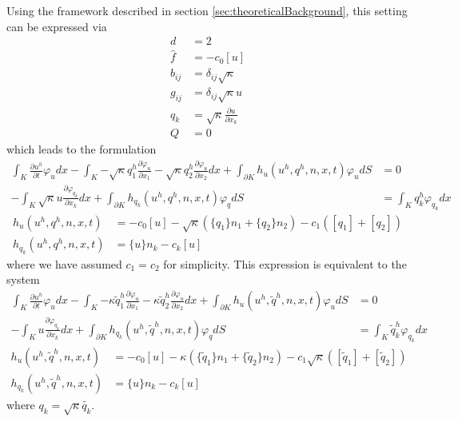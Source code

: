 Using the framework described in section \ref{sec:theoreticalBackground}, this
setting can be expressed via
\begin{align}
  d &= 2\\
  \hat{f} &= -c_0 [u]\\
  b_{ij} &= \delta_{ij} \sqrt{\kappa}\\
  g_{ij} &= \delta_{ij} \sqrt{\kappa} u\\
  q_k &= \sqrt{\kappa} \frac{\partial u}{\partial x_k}\\
  Q &= 0
\end{align}
which leads to the formulation
\begin{align}
\label{eq:heat_u_equation}
	\int_K {\frac{\partial u^h}{\partial t} \varphi_u dx}
	- \int_K {
		-\sqrt{\kappa} q_1^h \frac{\partial \varphi_u}{\partial x_1}
		-\sqrt{\kappa} q_2^h \frac{\partial \varphi_u}{\partial x_2}
	dx}
	+ \int_{\partial K} {h_u(u^h, q^h, n, x, t) \varphi_u dS}
	&= 0\\
\label{eq:heat_q_equation}
	- \int_K {\sqrt{\kappa} u \frac{\partial \varphi_{q_k}}{\partial x_k} dx}
	+ \int_{\partial K} {h_{q_k}(u^h, q^h, n, x, t) \varphi_q dS}
	&= \int_K {q_k^h \varphi_{q_k} dx}
\end{align}
\begin{align}
\label{eq:heat_u_flux}
  h_u(u^h, q^h, n, x, t)
	&= -c_0 [u]
	- \sqrt{\kappa} (\{q_1\} n_1 + \{q_2\} n_2)
	- c_1 ([q_1] + [q_2])\\
\label{eq:heat_q_flux}
  h_{q_k}(u^h, q^h, n, x, t)
  &= \{u\} n_k
  - c_k[u]
\end{align}
where we have assumed $c_1=c_2$ for simplicity. This expression is equivalent
to the system
\begin{align}
\label{eq:heat_u_equation2}
	\int_K {\frac{\partial u^h}{\partial t} \varphi_u dx}
	- \int_K {
		-\kappa \tilde{q}_1^h \frac{\partial \varphi_u}{\partial x_1}
		-\kappa \tilde{q}_2^h \frac{\partial \varphi_u}{\partial x_2}
	dx}
	+ \int_{\partial K} {h_u(u^h, \tilde{q}^h, n, x, t) \varphi_u dS}
	&= 0\\
\label{eq:heat_q_equation2}
	- \int_K {u \frac{\partial \varphi_{q_k}}{\partial x_k} dx}
	+ \int_{\partial K} {h_{q_k}(u^h, \tilde{q}^h, n, x, t) \varphi_q dS}
	&= \int_K {\tilde{q}_k^h \varphi_{q_k} dx}
\end{align}
\begin{align}
\label{eq:heat_u_flux2}
  h_u(u^h, \tilde{q}^h, n, x, t)
	&= -c_0 [u]
	- \kappa (\{\tilde{q}_1\} n_1 + \{\tilde{q}_2\} n_2)
	- c_1 \sqrt{\kappa} ([\tilde{q}_1] + [\tilde{q}_2])\\
\label{eq:heat_q_flux2}
  h_{q_k}(u^h, \tilde{q}^h, n, x, t)
  &= \{u\} n_k
  - c_k[u]
\end{align}
where $q_k = \sqrt{\kappa} \tilde{q_k}$.

